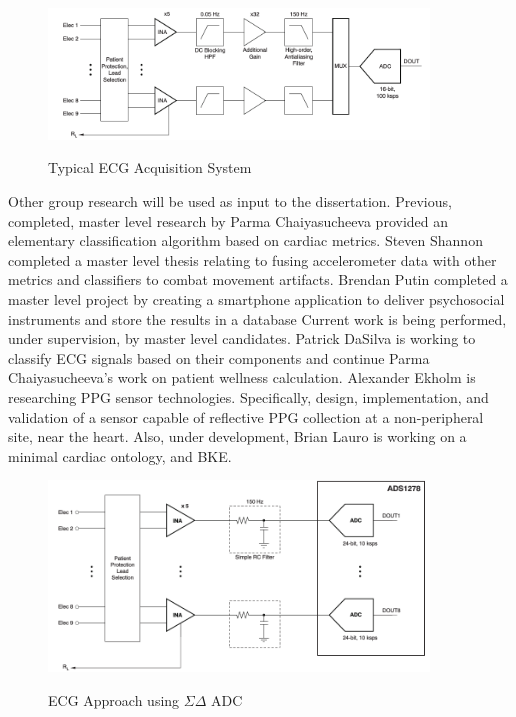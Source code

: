 \begin{figure}
	\begin{center}
		\label{fig:SAR_topology}
		\includegraphics[scale=1,width=0.9\textwidth]{Images/SAR_topology.png} 
		\caption{Typical ECG Acquisition System }
	\end{center}
\end{figure}

Other group research will be used as input to the dissertation. Previous, completed, master level research by Parma Chaiyasucheeva provided an elementary classification algorithm based on cardiac metrics\cite{Chaiyasucheeva2012}. Steven Shannon completed a master level thesis relating to fusing accelerometer data with other metrics and classifiers to combat movement artifacts\cite{Shannon2012}. Brendan Putin completed a master level project by creating a smartphone application to deliver psychosocial instruments and store the results in a database  \cite{Putin2011,Louro2013} Current work is being performed, under supervision, by master level candidates. Patrick DaSilva is working to classify ECG signals based on their components and continue Parma Chaiyasucheeva's work on patient wellness calculation. Alexander Ekholm is researching PPG sensor technologies. Specifically, design, implementation, and validation of a sensor capable of reflective PPG collection at a non-peripheral site, near the heart.  Also, under development, Brian Lauro is working on a minimal cardiac ontology, and BKE.

\begin{figure}
	\begin{center}
		\label{fig:sigmaDelta_topology}
		\includegraphics[scale=1,width=0.9\textwidth]{Images/sigmaDelta_topology_simultanious.png} 
		\caption{ECG Approach using $\Sigma\Delta $ ADC}
	\end{center}
\end{figure}

